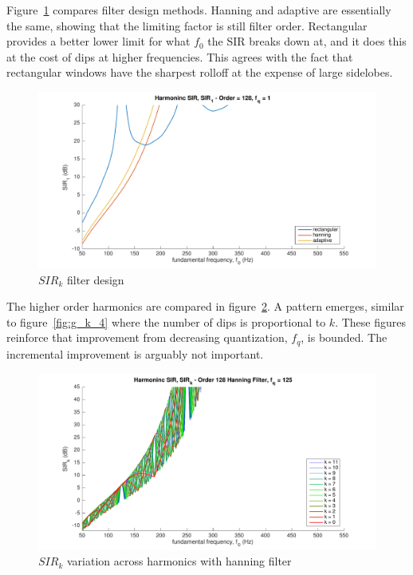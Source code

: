 \documentclass [11pt, proquest,oneside] {ganter_thesis}[2015/03/03]
\begin{document}
Figure~\ref{fig:sir_k_2} compares filter design methods.  Hanning and adaptive are essentially the same, showing that the limiting factor is still filter order.  Rectangular provides a better lower limit for what $f_0$ the SIR breaks down at, and it does this at the cost of dips at higher frequencies.  This agrees with the fact that rectangular windows have the sharpest rolloff at the expense of large sidelobes.

\begin{figure}[!ht]
  \centering
    \includegraphics[width=1\textwidth]{sir_k_2}
    \caption{$SIR_k$ filter design}\label{fig:sir_k_2}
\end{figure}

The higher order harmonics are compared in figure~\ref{fig:sir_k_3}.  A pattern emerges, similar to figure~\ref{fig:g_k_4} where the number of dips is proportional to $k$.  These figures reinforce that improvement from decreasing quantization, $f_q$, is bounded.  The incremental improvement is arguably not important.

\begin{figure}[!ht]
  \centering
    \includegraphics[width=1\textwidth]{sir_k_3}
    \caption{$SIR_k$ variation across harmonics with hanning filter}\label{fig:sir_k_3}
\end{figure}
\end{document}
